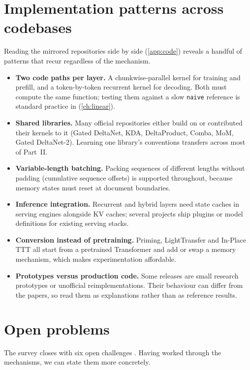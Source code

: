\section{Implementation patterns across codebases}\label{sec:c14-patterns}

Reading the mirrored repositories side by side (\cref{app:code}) reveals a handful of
patterns that recur regardless of the mechanism.

\begin{itemize}
  \item \textbf{Two code paths per layer.} A chunkwise-parallel kernel for training and
    prefill, and a token-by-token recurrent kernel for decoding. Both must compute the same
    function; testing them against a slow \texttt{naive} reference is standard practice in
    \fla{} (\cref{ch:linear}).
  \item \textbf{Shared libraries.} Many official repositories either build on \fla{} or
    contributed their kernels to it (Gated DeltaNet, KDA, DeltaProduct, Comba, MoM, Gated
    DeltaNet-2). Learning one library's conventions transfers across most of Part~II.
  \item \textbf{Variable-length batching.} Packing sequences of different lengths without
    padding (cumulative sequence offsets) is supported throughout, because memory states must
    reset at document boundaries.
  \item \textbf{Inference integration.} Recurrent and hybrid layers need state caches in
    serving engines alongside KV caches; several projects ship plugins or model definitions
    for existing serving stacks.
  \item \textbf{Conversion instead of pretraining.} Priming, LightTransfer and In-Place TTT
    all start from a pretrained Transformer and add or swap a memory mechanism, which makes
    experimentation affordable.
  \item \textbf{Prototypes versus production code.} Some releases are small research
    prototypes or unofficial reimplementations. Their behaviour can differ from the papers,
    so read them as explanations rather than as reference results.
\end{itemize}

\section{Open problems}\label{sec:c14-open}

The survey closes with six open challenges \citep{zhoubian2026memory}. Having worked through
the mechanisms, we can state them more concretely.

